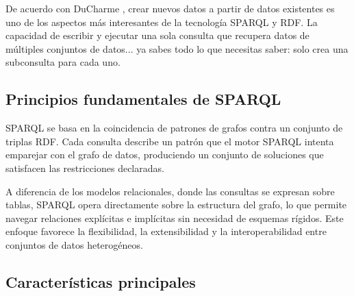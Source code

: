\documentclass{article}
\begin{document}
De acuerdo con DuCharme \cite[p. 115]{ducharme2013learning}, crear nuevos datos a partir de datos existentes es uno de los aspectos más interesantes de la tecnología SPARQL y RDF. \cite[p. ] {ducharme2013learning} La capacidad de escribir y ejecutar una sola consulta que recupera datos de múltiples conjuntos de datos... ya sabes todo lo que necesitas saber: solo crea una subconsulta para cada uno.

\subsection{Principios fundamentales de SPARQL}

SPARQL se basa en la coincidencia de patrones de grafos contra un conjunto de triplas RDF. Cada consulta describe un patrón que el motor SPARQL intenta emparejar con el grafo de datos, produciendo un conjunto de soluciones que satisfacen las restricciones declaradas.

A diferencia de los modelos relacionales, donde las consultas se expresan sobre tablas, SPARQL opera directamente sobre la estructura del grafo, lo que permite navegar relaciones explícitas e implícitas sin necesidad de esquemas rígidos. Este enfoque favorece la flexibilidad, la extensibilidad y la interoperabilidad entre conjuntos de datos heterogéneos.

\subsection{Características principales}
\end{document}
